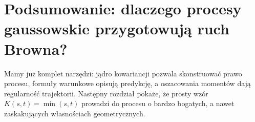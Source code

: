 \section{Podsumowanie: dlaczego procesy gaussowskie przygotowują ruch Browna?}
Mamy już komplet narzędzi: jądro kowariancji pozwala skonstruować
prawo procesu, formuły warunkowe opisują predykcję, a
oszacowania momentów dają regularność trajektorii.
Następny rozdział pokaże, że prosty wzór $K(s,t)=\min(s,t)$
prowadzi do procesu o bardzo bogatych, a nawet zaskakujących
własnościach geometrycznych.

